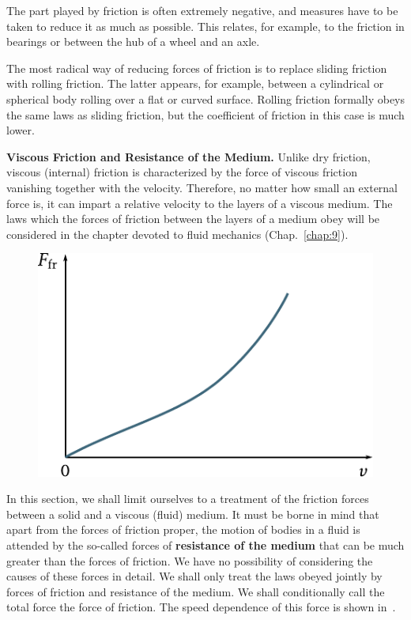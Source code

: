 The part played by friction is often extremely negative, and measures have to be taken to reduce it as much as possible. This relates, for example, to the friction in bearings or between the hub of a wheel and an axle.

The most radical way of reducing forces of friction is to replace sliding friction with rolling friction. The latter appears, for example, between a cylindrical or spherical body rolling over a flat or curved surface. Rolling friction formally obeys the same laws as sliding friction, but the coefficient of friction in this case is much lower.

\textbf{Viscous Friction and Resistance of the Medium.} Unlike dry friction, viscous (internal) friction is characterized by the force of viscous friction vanishing together with the velocity. Therefore, no matter how small an external force is, it can impart a relative velocity to the layers of a viscous medium. The laws which the forces of friction between the layers of a medium obey will be considered in the chapter devoted to fluid mechanics (Chap.~\ref{chap:9}).

\begin{figure}[t]
	\begin{center}
		\includegraphics[scale=1]{figures/ch_02/fig_2_10.pdf}
		\caption[]{}
		\label{fig:2_10}
	\end{center}
	\vspace{-0.7cm}
\end{figure}

In this section, we shall limit ourselves to a treatment of the friction forces between a solid and a viscous (fluid) medium. It must be borne in mind that apart from the forces of friction proper, the motion of bodies in a fluid is attended by the so-called forces of \textbf{resistance of the medium} that can be much greater than the forces of friction. We have no possibility of considering the causes of these forces in detail. We shall only treat the laws obeyed jointly by forces of friction and resistance of the medium. We shall conditionally call the total force the force of friction. The speed dependence of this force is shown in~.

